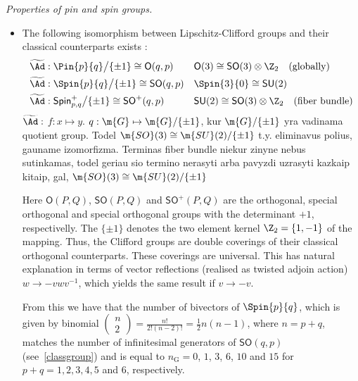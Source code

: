 %
\begin{unit}\textit{Properties of pin and spin groups.}
\begin{itemize}
\item[$\bullet$] The following isomorphism between
Lipschitz-Clifford groups and their classical counterparts exists
:
\begin{align*}
  &\widetilde{\Ad}: \Pin{p}{q}\big/\{\pm 1\}\cong\mathsf{O}(q,p)&& \mathsf{O}(3)\cong \mathsf{SO}(3)\otimes \Z_2\quad \textrm{(globally)}\\
    &\widetilde{\Ad}: \Spin{p}{q}\big/\{\pm 1\}\cong\mathsf{SO}(q,p)&& \Spin{3}{0}\cong \mathsf{SU}(2)\\
    &\widetilde{\Ad}: \mathsf{Spin}^{+}_{p,q}\big/\{\pm 1\}\cong\mathsf{SO}^+(q,p)&& \mathsf{SU}(2)\cong  \mathsf{SO}(3)\otimes\Z_2\quad  \textrm{(fiber bundle)}
\end{align*}
 $\widetilde{\Ad}:$ 
$f:x\mapsto y$.  $q:\m{G}\mapsto\m{G}/\{\pm
1\}$, kur $\m{G}/\{\pm 1\}$ yra vadinama quotient group. Todel
$\m{SO}(3)\cong\m{SU}(2)/\{\pm 1\}$ t.y. eliminavus polius,
gauname izomorfizma. Terminas fiber bundle niekur zinyne nebus
sutinkamas, todel geriau sio termino nerasyti arba pavyzdi
uzrasyti kazkaip kitaip, gal, $\m{SO}(3)\cong\m{SU}(2)/\{\pm 1\}$

Here $\mathsf{O}(P,Q)$, $\mathsf{SO}(P,Q)$ and
$\mathsf{SO}^+(P,Q)$ are the orthogonal, special orthogonal and
special orthogonal groups with the determinant $+1$,
respectivelly. The $\{\pm 1\}$ denotes the two element kernel
$\Z_2=\{1,-1\}$ of the mapping. Thus, the Clifford groups are
double coverings of their classical orthogonal counterparts. These
coverings are universal. This has natural explanation in terms of
vector reflections (realised as twisted adjoin action) $w\to-v w
v^{-1}$, which   yields the same result if $v\to -v$.

From this we have that the number of bivectors of $\Spin{p}{q}$,
which is given by binomial
$\left(\begin{smallmatrix}n\\2\end{smallmatrix}\right)=
\tfrac{n!}{2!(n-2)!}=\tfrac{1}{2}n(n-1)$, where $n=p+q$, matches
the number of infinitesimal generators of $\mathsf{SO}(q,p)$
(see~\ref{classgroup}) and is equal to $n_{\mathrm{G}}=0$, $1$,
$3$, $6$, $10$ and $15$ for $p+q=1,2,3,4,5$ and $6$, respectively.


\end{itemize}
\end{unit}
